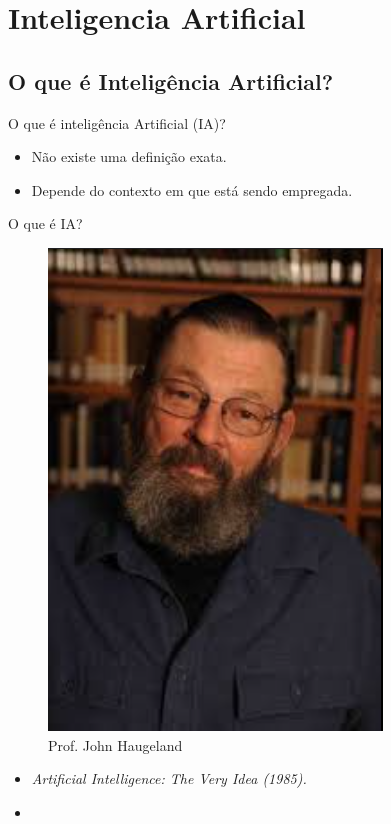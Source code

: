 \section{Inteligencia Artificial}
\subsection{O que é Inteligência Artificial?}
\begin{frame}{O que é inteligência Artificial (IA)?}
    \begin{block}{}
        \begin{itemize}
            \item Não existe uma definição exata.
            \item Depende do contexto em que está sendo empregada.
        \end{itemize}
    \end{block}
\end{frame}
\begin{frame}{O que é IA?}
    \begin{minipage}{0.5\linewidth}
        \begin{figure}
            \centering
            \includegraphics[width=0.6\linewidth]{imagens//secao1/haugeland1985.png}
            \caption{Prof. John Haugeland}
        \end{figure}
    \end{minipage}
    \begin{minipage}{0.5\linewidth}
        \begin{itemize}
        \justifying
            \item \textit{Artificial Intelligence: The Very Idea (1985).}
            \item {}
        \end{itemize}
    \end{minipage}
\end{frame}

